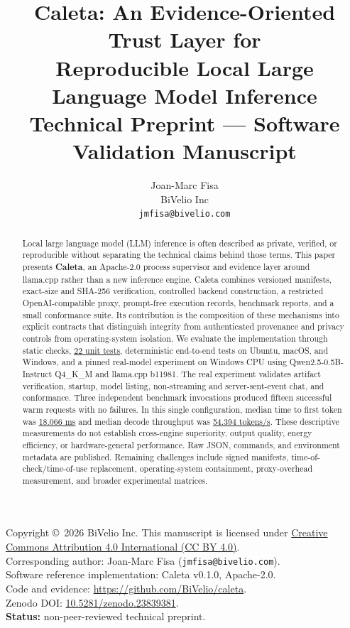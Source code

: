 \documentclass[11pt,a4paper]{article}
\title{Caleta: An Evidence-Oriented Trust Layer for\\Reproducible Local Large Language Model Inference\\[0.6em]
\large Technical Preprint --- Software Validation Manuscript}
\author{Joan-Marc Fisa\\
BiVelio Inc\\
\texttt{jmfisa@bivelio.com}}
\date{\paperdate}
\newcommand{\softwareversion}{0.1.0}
\newcommand{\artifact}[2]{\href{https://github.com/BiVelio/caleta/blob/evidence-v1.1/#1}{#2}}
\begin{document}
\maketitle

\begin{center}
\small
Copyright \copyright\ 2026 BiVelio Inc. This manuscript is licensed under \href{https://creativecommons.org/licenses/by/4.0/}{Creative Commons Attribution 4.0 International (CC BY 4.0)}.\\[0.8em]
Corresponding author: Joan-Marc Fisa (\texttt{jmfisa@bivelio.com}).\\[0.8em]
Software reference implementation: Caleta v\softwareversion, Apache-2.0.\\[0.8em]
Code and evidence: \url{https://github.com/BiVelio/caleta}.\\[0.8em]
Zenodo DOI: \href{https://doi.org/10.5281/zenodo.23839381}{10.5281/zenodo.23839381}.\\[0.8em]
\textbf{Status:} non-peer-reviewed technical preprint.
\end{center}

\begin{abstract}
Local large language model (LLM) inference is often described as private, verified, or reproducible without separating the technical claims behind those terms. This paper presents \textbf{Caleta}, an Apache-2.0 process supervisor and evidence layer around llama.cpp rather than a new inference engine. Caleta combines versioned manifests, exact-size and SHA-256 verification, controlled backend construction, a restricted OpenAI-compatible proxy, prompt-free execution records, benchmark reports, and a small conformance suite. Its contribution is the composition of these mechanisms into explicit contracts that distinguish integrity from authenticated provenance and privacy controls from operating-system isolation. We evaluate the implementation through static checks, \artifact{experiments/software-validation/results/table1-software-validation.json}{22 unit tests}, deterministic end-to-end tests on Ubuntu, macOS, and Windows, and a pinned real-model experiment on Windows CPU using Qwen2.5-0.5B-Instruct Q4\_K\_M and llama.cpp b11981. The real experiment validates artifact verification, startup, model listing, non-streaming and server-sent-event chat, and conformance. Three independent benchmark invocations produced fifteen successful warm requests with no failures. In this single configuration, median time to first token was \artifact{experiments/real-gguf-qwen2.5-0.5b/results/summary.json}{18.066 ms} and median decode throughput was \artifact{experiments/real-gguf-qwen2.5-0.5b/results/summary.json}{54.394 tokens/s}. These descriptive measurements do not establish cross-engine superiority, output quality, energy efficiency, or hardware-general performance. Raw JSON, commands, and environment metadata are published. Remaining challenges include signed manifests, time-of-check/time-of-use replacement, operating-system containment, proxy-overhead measurement, and broader experimental matrices.
\end{abstract}
\end{document}
